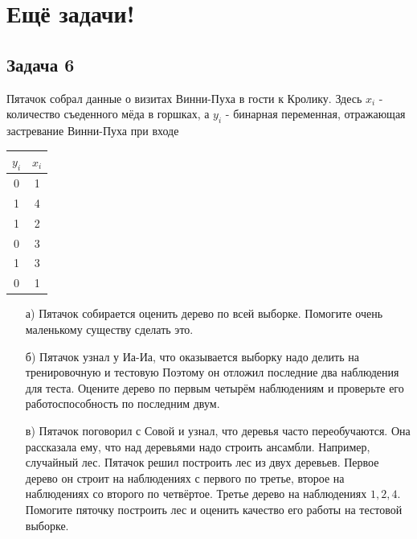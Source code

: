 \documentclass[12pt, a4paper, oneside]{article}
\begin{document}


\section*{Ещё задачи!} 

\subsection*{Задача 6}

Пятачок собрал данные о визитах Винни-Пуха в гости к Кролику. Здесь $x_i$ - количество съеденного мёда в горшках, а $y_i$  - бинарная переменная, отражающая застревание Винни-Пуха при входе 

\begin{center}
	\begin{tabular}{c|c}
		$y_i$ & $x_i$ \\
		\hline
		0  & 1 \\
		1 & 4\\
		1 & 2\\
		0 & 3 \\
		1 & 3 \\
		0 & 1
	\end{tabular}
\end{center}

\begin{enumerate}
\item[а)] Пятачок собирается оценить дерево по всей выборке.  Помогите очень маленькому существу сделать это. 
\item[б)] Пятачок узнал у Иа-Иа, что оказывается выборку надо делить на тренировочную и тестовую Поэтому он отложил последние два наблюдения для теста. Оцените дерево по первым четырём наблюдениям и проверьте его работоспособность по последним двум. 
\item[в)]  Пятачок поговорил с Совой и узнал, что деревья часто переобучаются. Она рассказала ему, что над деревьями надо строить ансамбли. Например, случайный лес. Пятачок решил построить лес из двух деревьев. Первое дерево он строит на наблюдениях с первого по третье, второе на наблюдениях со второго по четвёртое.  Третье дерево на наблюдениях $1,2,4$. Помогите пяточку построить лес и оценить качество его работы на тестовой выборке. 

\end{enumerate}
\end{document}
